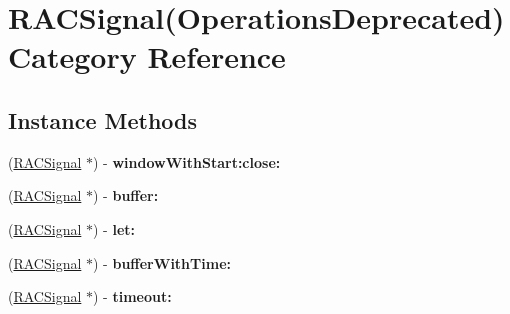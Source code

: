 \hypertarget{category_r_a_c_signal_07_operations_deprecated_08}{}\section{R\+A\+C\+Signal(Operations\+Deprecated) Category Reference}
\label{category_r_a_c_signal_07_operations_deprecated_08}
\subsection*{Instance Methods}
\begin{DoxyCompactItemize}
\item 
\mbox{\label{category_r_a_c_signal_07_operations_deprecated_08_a5a73759445200558980dbf805453a916}} 
(\mbox{\hyperlink{interface_r_a_c_signal}{R\+A\+C\+Signal}} $\ast$) -\/ {\bfseries window\+With\+Start\+:close\+:}
\item 
\mbox{\label{category_r_a_c_signal_07_operations_deprecated_08_a88927a3c08fd2afef7c0d468d4b76053}} 
(\mbox{\hyperlink{interface_r_a_c_signal}{R\+A\+C\+Signal}} $\ast$) -\/ {\bfseries buffer\+:}
\item 
\mbox{\label{category_r_a_c_signal_07_operations_deprecated_08_a3d0f63043e188de9899c8a3bd7b33bab}} 
(\mbox{\hyperlink{interface_r_a_c_signal}{R\+A\+C\+Signal}} $\ast$) -\/ {\bfseries let\+:}
\item 
\mbox{\label{category_r_a_c_signal_07_operations_deprecated_08_a5e165c9c9996ead5c915919177086518}} 
(\mbox{\hyperlink{interface_r_a_c_signal}{R\+A\+C\+Signal}} $\ast$) -\/ {\bfseries buffer\+With\+Time\+:}
\item 
\mbox{\label{category_r_a_c_signal_07_operations_deprecated_08_a8a90cc688f9ae77032d02880fc5ed0b6}} 
(\mbox{\hyperlink{interface_r_a_c_signal}{R\+A\+C\+Signal}} $\ast$) -\/ {\bfseries timeout\+:}
\item 
\mbox{\label{category_r_a_c_signal_07_operations_deprecated_08_aa51b8a80086c80fff94c0e1421ebcdad}} 

\end{DoxyCompactItemize}

